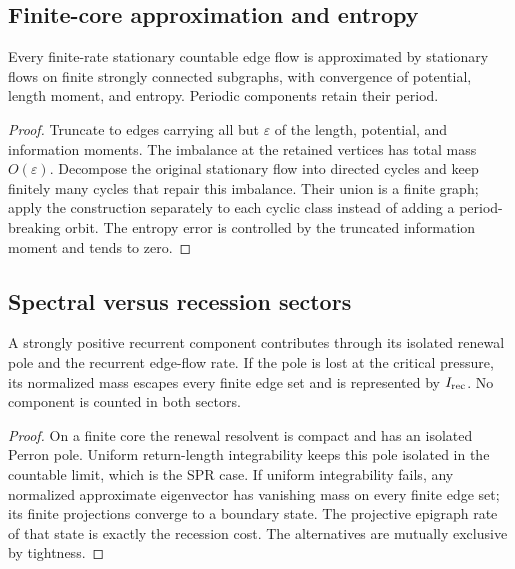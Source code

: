 \subsection{Finite-core approximation and entropy}

\begin{theorem}
\label{thm:r8-a3-flow-approx}
Every finite-rate stationary countable edge flow is approximated by stationary
flows on finite strongly connected subgraphs, with convergence of potential,
length moment, and entropy.  Periodic components retain their period.
\end{theorem}

\begin{proof}
Truncate to edges carrying all but $\varepsilon$ of the length, potential, and
information moments.  The imbalance at the retained vertices has total mass
$O(\varepsilon)$.  Decompose the original stationary flow into directed cycles
and keep finitely many cycles that repair this imbalance.  Their union is a
finite graph; apply the construction separately to each cyclic class instead
of adding a period-breaking orbit.  The entropy error is controlled by the
truncated information moment and tends to zero.
\end{proof}

\subsection{Spectral versus recession sectors}

\begin{theorem}
\label{thm:r8-a3-dichotomy}
A strongly positive recurrent component contributes through its isolated
renewal pole and the recurrent edge-flow rate.  If the pole is lost at the
critical pressure, its normalized mass escapes every finite edge set and is
represented by $I_{\rm rec}$.  No component is counted in both sectors.
\end{theorem}

\begin{proof}
On a finite core the renewal resolvent is compact and has an isolated Perron
pole.  Uniform return-length integrability keeps this pole isolated in the
countable limit, which is the SPR case.  If uniform integrability fails, any
normalized approximate eigenvector has vanishing mass on every finite edge set;
its finite projections converge to a boundary state.  The projective epigraph
rate of that state is exactly the recession cost.  The alternatives are
mutually exclusive by tightness.
\end{proof}

